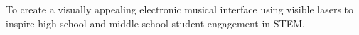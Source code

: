 To create a visually appealing electronic musical interface using visible lasers to inspire high school and middle school student engagement in STEM.
